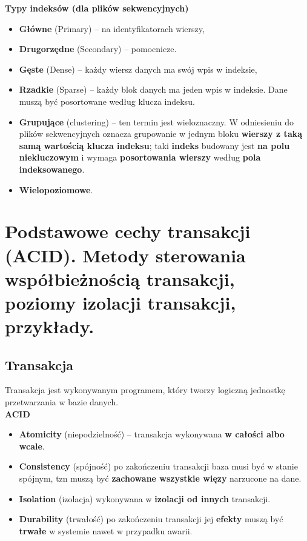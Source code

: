 \documentclass[main.tex]{subfiles}
\begin{document}
    \noindent \textbf{Typy indeksów (dla plików sekwencyjnych)}
    \begin{itemize}[noitemsep]
        \item \textbf{Główne} (Primary) -- na identyfikatorach wierszy,
        \item \textbf{Drugorzędne} (Secondary) -- pomocnicze.\\

        \item \textbf{Gęste} (Dense) -- każdy wiersz danych ma swój wpis w indeksie,
        \item \textbf{Rzadkie} (Sparse) -- każdy blok danych ma jeden wpis w indeksie. Dane muszą być posortowane według
        klucza indeksu.\\

        \item \textbf{Grupujące} (clustering) – ten termin jest wieloznaczny. W odniesieniu do plików sekwencyjnych
        oznacza grupowanie w jednym bloku \textbf{wierszy z taką samą wartością klucza indeksu}; taki \textbf{indeks}
        budowany jest \textbf{na polu niekluczowym} i wymaga \textbf{posortowania wierszy} według \textbf{pola indeksowanego}.
        \item \textbf{Wielopoziomowe}.
    \end{itemize}


    \section{Podstawowe cechy transakcji (ACID). Metody sterowania współbieżnością transakcji, poziomy izolacji transakcji, przykłady.}

    \subsection{Transakcja}
    Transakcja jest wykonywanym programem, który tworzy logiczną jednostkę przetwarzania w
    bazie danych.\\

    \noindent \textbf{ACID}
    \begin{itemize}[noitemsep]
        \item \textbf{Atomicity} (niepodzielność) -- transakcja wykonywana \textbf{w całości albo wcale}.
        \item \textbf{Consistency} (spójność) po zakończeniu transakcji baza musi być w stanie spójnym, tzn muszą być \textbf{zachowane wszystkie więzy} narzucone na dane.
        \item \textbf{Isolation} (izolacja) wykonywana w \textbf{izolacji od innych} transakcji.
        \item \textbf{Durability} (trwałość) po zakończeniu transakcji jej \textbf{efekty} muszą być \textbf{trwałe} w systemie nawet w przypadku awarii.
    \end{itemize}
\end{document}
